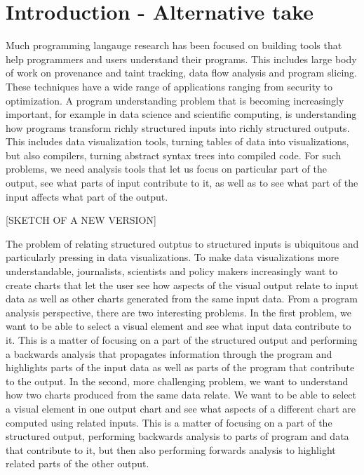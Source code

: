 \section{Introduction - Alternative take}

Much programming langauge research has been focused on building tools that help programmers and users understand their programs. This includes large body of work on provenance and taint tracking, data flow analysis and program slicing. These techniques have a wide range of applications ranging from security to optimization. A program understanding problem that is becoming increasingly important, for example in data science and scientific computing, is understanding how programs transform richly structured inputs into richly structured outputs. This includes data visualization tools, turning tables of data into visualizations, but also compilers, turning abstract syntax trees into compiled code. For such problems, we need analysis tools that let us focus on particular part of the output, see what parts of input contribute to it, as well as to see what part of the input affects what part of the output.

[SKETCH OF A NEW VERSION]

The problem of relating structured outptus to structured inputs is ubiquitous and particularly pressing in data visualizations. To make data visualizations more understandable, journalists, scientists and policy makers increasingly want to create charts that let the user see how aspects of the visual output relate to input data as well as other charts generated from the same input data. From a program analysis perspective, there are two interesting problems. In the first problem, we want to be able to select a visual element and see what input data contribute to it. This is a matter of focusing on a part of the structured output and performing a backwards analysis that propagates information through the program and highlights parts of the input data as well as parts of the program that contribute to the output. In the second, more challenging problem, we want to understand how two charts produced from the same data relate. We want to be able to select a visual element in one output chart and see what aspects of a different chart are computed using related inputs. This is a matter of focusing on a part of the structured output, performing backwards analysis to parts of program and data that contribute to it, but then also performing forwards analysis to highlight related parts of the other output.

